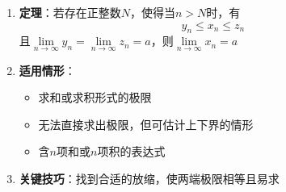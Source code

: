 \documentclass[../book.tex]{subfiles}
\begin{document}
    \begin{enumerate}
        \item \textbf{定理}：若存在正整数$N$，使得当$n > N$时，有
        \[
            y_n \le x_n \le z_n
        \]
        且$\lim\limits_{n\to\infty} y_n = \lim\limits_{n\to\infty} z_n = a$，则$\lim\limits_{n\to\infty} x_n = a$

        \item \textbf{适用情形}：
        \begin{itemize}
            \item 求和或求积形式的极限
            \item 无法直接求出极限，但可估计上下界的情形
            \item 含$n$项和或$n$项积的表达式
        \end{itemize}

        \item \textbf{关键技巧}：找到合适的放缩，使两端极限相等且易求
    \end{enumerate}
\end{document}
